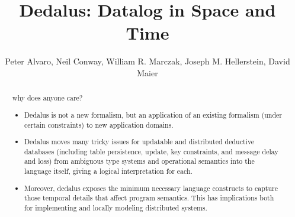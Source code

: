 \documentclass{acm_proc_article-sp-sigmod09}
\newcommand{\wrm}[1]{{\color{BurntOrange}{#1 -- wrm}}}
\begin{document}
%

\title{Dedalus: 
Datalog in Space and Time} 
%


\author{Peter Alvaro, Neil Conway, William R. Marczak, Joseph M. Hellerstein, David Maier}

\maketitle

\begin{abstract}

why does anyone care?

\begin{itemize}
\item Dedalus is not a new formalism, but an application of an existing formalism (under certain constraints) to new application domains.
\item Dedalus moves many tricky issues for updatable and distributed deductive databases (including table persistence, update, key constraints, and message delay and loss) from ambiguous type systems and operational semantics into the language itself, giving a logical interpretation for each.
\wrm{This paragraph basically says we're presenting an approach to resolving ambiguities in Overlog through logic rather than Operational semantics as proposed in the max planck paper, right?}
\item Moreover, dedalus exposes the minimum necessary language constructs to capture those temporal details that affect program semantics.  This has
implications both for implementing and locally modeling distributed systems.
\end{itemize}
\end{abstract}













\appendix


\end{document}
